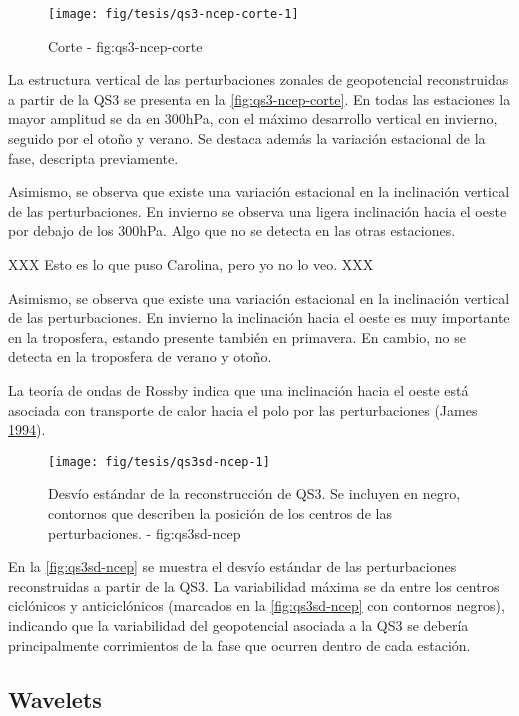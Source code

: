 \documentclass[spanish,a4paper,12p]{book}
\begin{document}
\begin{figure*}
\texttt{[image: fig/tesis/qs3-ncep-corte-1]} \caption{Corte - fig:qs3-ncep-corte}\label{fig:qs3-ncep-corte}
\end{figure*}

La estructura vertical de las perturbaciones zonales de geopotencial
reconstruidas a partir de la QS3 se presenta en la
\autoref{fig:qs3-ncep-corte}. En todas las estaciones la mayor amplitud
se da en 300hPa, con el máximo desarrollo vertical en invierno, seguido
por el otoño y verano. Se destaca además la variación estacional de la
fase, descripta previamente.

Asimismo, se observa que existe una variación estacional en la
inclinación vertical de las perturbaciones. En invierno se observa una
ligera inclinación hacia el oeste por debajo de los 300hPa. Algo que no
se detecta en las otras estaciones.

XXX Esto es lo que puso Carolina, pero yo no lo veo. XXX

Asimismo, se observa que existe una variación estacional en la
inclinación vertical de las perturbaciones. En invierno la inclinación
hacia el oeste es muy importante en la troposfera, estando presente
también en primavera. En cambio, no se detecta en la troposfera de
verano y otoño.

La teoría de ondas de Rossby indica que una inclinación hacia el oeste
está asociada con transporte de calor hacia el polo por las
perturbaciones (James \protect\hyperlink{ref-James}{1994}).

\begin{figure*}
\texttt{[image: fig/tesis/qs3sd-ncep-1]} \caption{Desvío estándar de la reconstrucción de QS3. Se incluyen en negro, contornos que describen la posición de los centros de las perturbaciones. - fig:qs3sd-ncep}\label{fig:qs3sd-ncep}
\end{figure*}

En la \autoref{fig:qs3sd-ncep} se muestra el desvío estándar de las
perturbaciones reconstruidas a partir de la QS3. La variabilidad máxima
se da entre los centros ciclónicos y anticiclónicos (marcados en la
\autoref{fig:qs3sd-ncep} con contornos negros), indicando que la
variabilidad del geopotencial asociada a la QS3 se debería
principalmente corrimientos de la fase que ocurren dentro de cada
estación.

\subsection{Wavelets}\label{wavelets}
\end{document}
